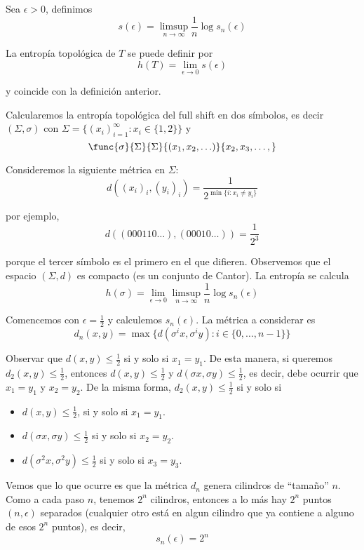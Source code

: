 \documentclass[	docname= Sistemas\ Din\'amicos,
				finished=1,
				semester=1,
				year=2017,
				professor=Godofredo\ Iommi,
				sigla=MAT2565]{apunte}
\begin{document}
\begin{defn} Sea $\epsilon > 0$, definimos
	$$s(\epsilon) = \limsup_{n \to \infty} \frac{1}{n} \log s_{n}(\epsilon)$$
\end{defn}

\begin{defn} La entropía topológica de $T$ se puede definir por
	$$h(T) = \lim_{\epsilon \to 0} s(\epsilon)$$

y coincide con la definición anterior.
\end{defn}

\begin{ex} Calcularemos la entropía topológica del full shift en dos símbolos, es decir $(\Sigma, \sigma)$ con $\Sigma = \{(x_{i})_{i=1}^{\infty} : x_{i} \in \{1,2\}\}$ y
	$$\func{\sigma}{\Sigma}{\Sigma}
				{(x_{1}, x_{2}, \ldots)}{x_{2}, x_{3}, \ldots,}$$

Consideremos la siguiente métrica en $\Sigma$:
	$$d((x_{i})_{i}, (y_{i})_{i}) = \frac{1}{2^{\min\{i : x_{i} \neq y_{i}\}}}$$

por ejemplo,
	$$d((000110\ldots), (00010\ldots)) = \frac{1}{2^{3}}$$

porque el tercer símbolo es el primero en el que difieren. Observemos que el espacio $(\Sigma, d)$ es compacto (es un conjunto de Cantor). La entropía se calcula
	$$h(\sigma) = \lim_{\epsilon \to 0} \limsup_{n \to \infty} \frac{1}{n} \log s_{n}(\epsilon)$$
	
Comencemos con $\epsilon = \frac{1}{2}$ y calculemos $s_{n}(\epsilon)$. La métrica a considerar es
	$$d_{n}(x,y) = \max \{d(\sigma^{i}x, \sigma^{i}y) : i \in \{0, \ldots, n-1\}\}$$

Observar que $d(x,y) \leq \frac{1}{2}$ si y solo si $x_{1} = y_{1}$. De esta manera, si queremos $d_{2}(x,y) \leq \frac{1}{2}$, entonces $d(x,y) \leq \frac{1}{2}$ y $d(\sigma x, \sigma y) \leq \frac{1}{2}$, es decir, debe ocurrir que $x_{1} = y_{1}$ y $x_{2} = y_{2}$. De la misma forma, $d_{2}(x,y) \leq \frac{1}{2}$ si y solo si
	\begin{itemize}
		\item $d(x,y) \leq \frac{1}{2}$, si y solo si $x_{1} = y_{1}$.
		\item $d(\sigma x,\sigma y) \leq \frac{1}{2}$ si y solo si $x_{2} = y_{2}$.
		\item $d(\sigma^{2} x, \sigma^{2}y) \leq \frac{1}{2}$ si y solo si $x_{3} = y_{3}$.
	\end{itemize}

Vemos que lo que ocurre es que la métrica $d_{n}$ genera cilindros de ``tamaño'' $n$. Como a cada paso $n$, tenemos $2^{n}$ cilindros, entonces a lo más hay $2^{n}$ puntos $(n,\epsilon)$ separados (cualquier otro está en algun cilindro que ya contiene a alguno de esos $2^{n}$ puntos), es decir,
	$$s_{n}(\epsilon) = 2^{n}$$


\end{ex}
\end{document}
